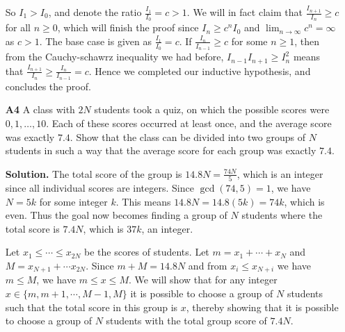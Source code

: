 \documentclass[11pt,a4paper]{article}
\newcommand{\<}{\langle}
\renewcommand{\>}{\rangle}
\begin{document}
\begin{enumerate}
	So $I_1>I_0$, and denote the ratio $\frac{I_1}{I_0}=c>1$. We will in fact claim that $\frac{I_{n+1}}{I_n}\ge c$ for all $n\ge 0$, which will finish the proof since $I_n\ge c^nI_0$ and $\lim_{n\to\infty}c^n=\infty$ as $c>1$. The base case is given as $\frac{I_1}{I_0}=c$. If $\frac{I_{n}}{I_{n-1}}\ge c$ for some $n\ge 1$, then from the Cauchy-schawrz inequality we had before, $I_{n-1}I_{n+1}\ge I_n^2$ means that $\frac{I_{n+1}}{I_n}\ge \frac{I_n}{I_{n-1}}=c$. Hence we completed our inductive hypothesis, and concludes the proof. 
	
	\item[\textbf{A4}] A class with $2N$ students took a quiz, on which the possible scores were $0,1,\dots,10.$ Each of these scores occurred at least once, and the average score was exactly $7.4.$ Show that the class can be divided into two groups of $N$ students in such a way that the average score for each group was exactly $7.4.$
	
	\textbf{Solution.} The total score of the group is $14.8N=\frac{74N}{5}$, which is an integer since all individual scores are integers. Since $\gcd(74, 5)=1$, we have $N=5k$ for some integer $k$. This means $14.8N=14.8(5k)=74k$, which is even. Thus the goal now becomes finding a group of $N$ students where the total score is $7.4N$, which is $37k$, an integer. 
	
	Let $x_1\le\cdots\le x_{2N}$ be the scores of students. Let $m=x_1+\cdots + x_N$ and $M=x_{N+1}+\cdots x_{2N}$. Since $m+M=14.8N$ and from $x_i\le x_{N+i}$ we have $m\le M$, we have $m\le x\le M$. We will show that for any integer $x\in \{m, m+1, \cdots , M-1, M\}$ it is possible to choose a group of $N$ students such that the total score in this group is $x$, thereby showing that it is possible to choose a group of $N$ students with the total group score of $7.4N$. 
	

\end{enumerate}
\end{document}
